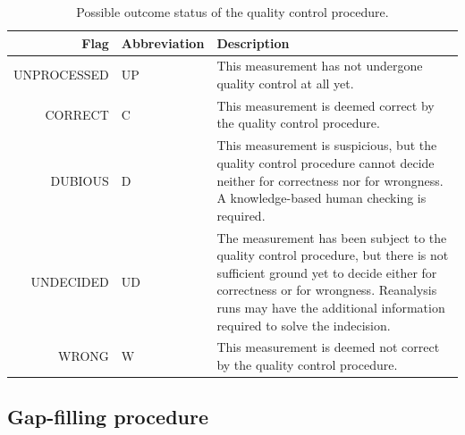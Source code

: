 \documentclass[authoryear,preprint,review,12pt]{elsarticle}
\begin{document}
\begin{table}[]
    \begin{scriptsize}
    \centering
    \begin{tabular}{r l p{10cm}}
    \hline
    Flag & Abbreviation & Description \\
    \hline
	UNPROCESSED & UP & This measurement has not undergone quality control at all yet.\\
	CORRECT     & C  & This measurement is deemed correct by the quality control procedure.\\
	DUBIOUS     & D  & This measurement is suspicious, but the quality control procedure cannot decide neither for correctness nor for wrongness. A knowledge-based human checking is required. \\
	UNDECIDED   & UD & The measurement has been subject to the quality control procedure, but there is not sufficient ground yet to decide either for correctness or for wrongness. Reanalysis runs may have the additional information required to solve the indecision.\\
	WRONG       & W  & This measurement is deemed not correct by the quality control procedure.\\
    \hline
    \end{tabular}
    \caption{Possible outcome status of the quality control procedure.}
    \label{tab:qcheckOutcomeFlagsSummary}
    \end{scriptsize}
\end{table}

\subsection{Gap-filling procedure}
\end{document}
